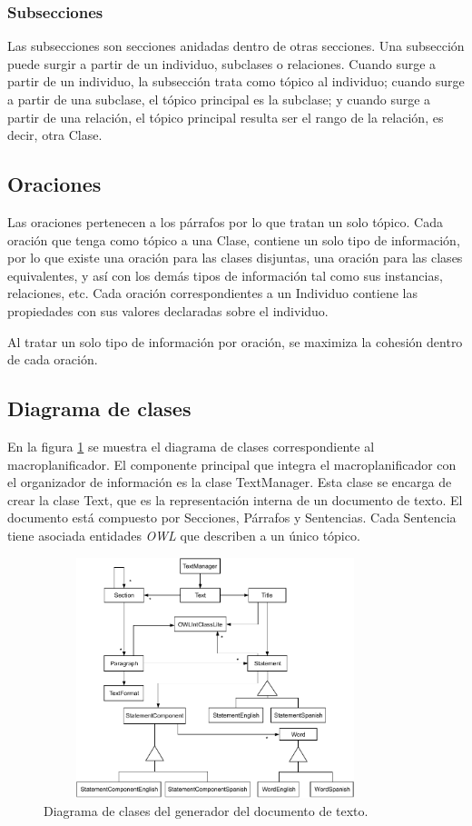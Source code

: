 \subsubsection{Subsecciones}
Las subsecciones son secciones anidadas dentro de otras secciones. Una subsección puede surgir a partir de un individuo, subclases o relaciones. Cuando surge a partir de un individuo, la subsección trata como tópico al individuo; cuando surge a partir de una subclase, el tópico principal es la subclase; y cuando surge a partir de una relación, el tópico principal resulta ser el rango de la relación, es decir, otra Clase.

\subsection{Oraciones}
Las oraciones pertenecen a los párrafos por lo que tratan un solo tópico. Cada oración que tenga como tópico a una Clase, contiene un solo tipo de información, por lo que existe una oración para las clases disjuntas, una oración para las clases equivalentes, y así con los demás tipos de información tal como sus instancias, relaciones, etc. Cada oración correspondientes a un Individuo contiene las propiedades con sus valores declaradas sobre el individuo.

Al tratar un solo tipo de información por oración, se maximiza la cohesión dentro de cada oración.


\subsection{Diagrama de clases}
En la figura \ref{fig:diagrama_clases_macroplanificador} se muestra el diagrama de clases correspondiente al macroplanificador. El componente principal que integra el macroplanificador con el organizador de información es la clase TextManager. Esta clase se encarga de crear la clase Text, que es la representación interna de un documento de texto. El documento está compuesto por Secciones, Párrafos y Sentencias. Cada Sentencia tiene asociada entidades \emph{OWL} que describen a un único tópico.

\begin{figure}[H]
    \centering
    \includegraphics[width=10cm, height=7cm]{img/generacion_documento/diagrama_clases_macroplanificador.pdf}
    \caption{Diagrama de clases del generador del documento de texto.}
    \label{fig:diagrama_clases_macroplanificador}
\end{figure}

